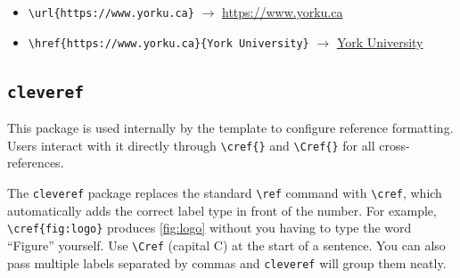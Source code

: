 	\begin{itemize}[noitemsep]
		\item \texttt{\textbackslash url\{https://www.yorku.ca\}} $\to$ \url{https://www.yorku.ca}
		\item \texttt{\textbackslash href\{https://www.yorku.ca\}\{York University\}} $\to$ \href{https://www.yorku.ca}{York University}
	\end{itemize}
	
	\subsection{\texttt{cleveref}}
	\noindent\colorbox{themecolour!15}{\parbox{\linewidth}{\small This package is used internally by the template to configure reference formatting. Users interact with it directly through \texttt{\textbackslash cref\{\}} and \texttt{\textbackslash Cref\{\}} for all cross-references.}}\vspace{0.5\baselineskip}
	
	The \texttt{cleveref} package replaces the standard \texttt{\textbackslash ref} command with \texttt{\textbackslash cref}, which automatically adds the correct label type in front of the number. For example, \texttt{\textbackslash cref\{fig:logo\}} produces \cref{fig:logo} without you having to type the word ``Figure'' yourself. Use \texttt{\textbackslash Cref} (capital C) at the start of a sentence. You can also pass multiple labels separated by commas and \texttt{cleveref} will group them neatly.
	
